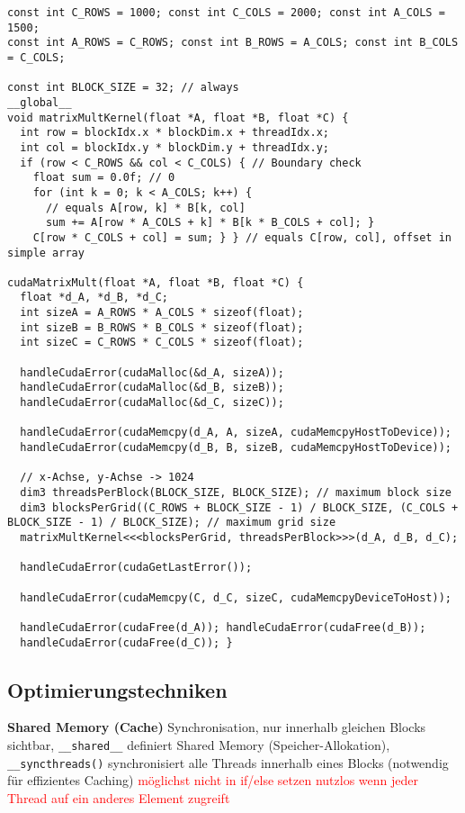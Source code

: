 \begin{lstlisting}
const int C_ROWS = 1000; const int C_COLS = 2000; const int A_COLS = 1500;
const int A_ROWS = C_ROWS; const int B_ROWS = A_COLS; const int B_COLS = C_COLS;

const int BLOCK_SIZE = 32; // always
__global__
void matrixMultKernel(float *A, float *B, float *C) {
  int row = blockIdx.x * blockDim.x + threadIdx.x;
  int col = blockIdx.y * blockDim.y + threadIdx.y;
  if (row < C_ROWS && col < C_COLS) { // Boundary check
  	float sum = 0.0f; // 0
  	for (int k = 0; k < A_COLS; k++) {
  	  // equals A[row, k] * B[k, col]
      sum += A[row * A_COLS + k] * B[k * B_COLS + col]; }
  	C[row * C_COLS + col] = sum; } } // equals C[row, col], offset in simple array

cudaMatrixMult(float *A, float *B, float *C) {
  float *d_A, *d_B, *d_C;
  int sizeA = A_ROWS * A_COLS * sizeof(float);
  int sizeB = B_ROWS * B_COLS * sizeof(float);
  int sizeC = C_ROWS * C_COLS * sizeof(float);

  handleCudaError(cudaMalloc(&d_A, sizeA));
  handleCudaError(cudaMalloc(&d_B, sizeB));
  handleCudaError(cudaMalloc(&d_C, sizeC));

  handleCudaError(cudaMemcpy(d_A, A, sizeA, cudaMemcpyHostToDevice));
  handleCudaError(cudaMemcpy(d_B, B, sizeB, cudaMemcpyHostToDevice));

  // x-Achse, y-Achse -> 1024
  dim3 threadsPerBlock(BLOCK_SIZE, BLOCK_SIZE); // maximum block size
  dim3 blocksPerGrid((C_ROWS + BLOCK_SIZE - 1) / BLOCK_SIZE, (C_COLS + BLOCK_SIZE - 1) / BLOCK_SIZE); // maximum grid size
  matrixMultKernel<<<blocksPerGrid, threadsPerBlock>>>(d_A, d_B, d_C);

  handleCudaError(cudaGetLastError());

  handleCudaError(cudaMemcpy(C, d_C, sizeC, cudaMemcpyDeviceToHost));

  handleCudaError(cudaFree(d_A)); handleCudaError(cudaFree(d_B));
  handleCudaError(cudaFree(d_C)); }
\end{lstlisting}

\subsection{Optimierungstechniken}

\textbf{Shared Memory (Cache)} Synchronisation, nur innerhalb gleichen Blocks sichtbar, \lstinline{__shared__} definiert Shared Memory (Speicher-Allokation), \lstinline{__syncthreads()} synchronisiert alle Threads innerhalb eines Blocks (notwendig für effizientes Caching) \textcolor{red}{möglichst nicht in if/else setzen} \textcolor{red}{nutzlos wenn jeder Thread auf ein anderes Element zugreift}

